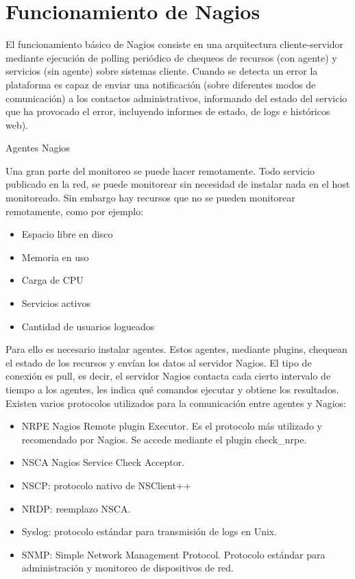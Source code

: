 \documentclass[11pt,a4paper]{article}
\begin{document}
    
\section{Funcionamiento de Nagios}


El funcionamiento básico de Nagios consiste en una arquitectura cliente-servidor mediante ejecución de polling periódico de chequeos de recursos (con agente) y servicios (sin agente) sobre sistemas cliente. Cuando se detecta un error la plataforma es capaz de enviar una notificación (sobre diferentes modos de comunicación) a los contactos administrativos, informando del estado del servicio que ha provocado el error, incluyendo informes de estado, de logs e históricos web).

Agentes Nagios

Una gran parte del monitoreo se puede hacer remotamente. Todo servicio publicado en la red, se puede monitorear sin necesidad de instalar nada en el host monitoreado. Sin embargo hay recursos que no se pueden monitorear remotamente, como por ejemplo:
\begin{itemize}

\item  Espacio libre en disco
\item  Memoria en uso
\item  Carga de CPU
\item  Servicios activos
\item  Cantidad de usuarios logueados

\end{itemize}

Para ello es necesario instalar agentes. Estos agentes, mediante plugins, chequean el estado de los recursos y envían los datos al servidor Nagios. El tipo de conexión es pull, es decir, el servidor Nagios contacta cada cierto intervalo de tiempo a los agentes, les indica qué comandos ejecutar y obtiene los resultados.
Existen varios protocolos utilizados para la comunicación entre agentes y Nagios:
\begin{itemize}
\item  NRPE Nagios Remote plugin Executor. Es el protocolo más utilizado y recomendado por Nagios. Se accede mediante el plugin check\_nrpe.
\item  NSCA Nagios Service Check Acceptor.
\item  NSCP: protocolo nativo de NSClient++
\item  NRDP: reemplazo NSCA.
\item  Syslog: protocolo estándar para transmisión de logs en Unix.
\item  SNMP: Simple Network Management Protocol. Protocolo estándar para administración y monitoreo de dispositivos de red.


\end{itemize}
\end{document}

